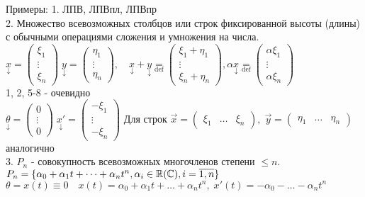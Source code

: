 \documentclass[../main.tex]{subfiles}
\begin{document}
Примеры: 1. ЛПВ, ЛПВпл, ЛПВпр
\\2. Множество всевозможных столбцов или строк фиксированной высоты (длины) с обычными операциями сложения и умножения на числа. $\underset{\downarrow}{x}=\begin{pmatrix}
    \xi_{1}\\ 
    \vdots \\ 
    \xi_{n}
\end{pmatrix}\; \underset{\downarrow}{y}=\begin{pmatrix}
    \eta_{1}\\ 
    \vdots \\ 
    \eta_{n}
\end{pmatrix}, \quad \underset{\downarrow}{x}+\underset{\downarrow}{y}\underset{\text{def}}{=} \begin{pmatrix}
    \xi_{1}+\eta_{1}\\ 
    \vdots \\ 
    \xi_{n}+\eta_{n}
\end{pmatrix}, \alpha \underset{\downarrow}{x}\underset{\text{def}}{=}\begin{pmatrix}
    \alpha \xi_{1}\\ 
    \vdots \\ 
    \alpha \xi_{n}
\end{pmatrix}$
\\ 1, 2, 5-8 - очевидно 
\\ $\underset{\downarrow}{\theta}=\begin{pmatrix}
    0\\ 
    \vdots \\ 
    0
\end{pmatrix}\; \underset{\downarrow}{x'}=\begin{pmatrix}
    -\xi_{1}\\ 
    \vdots \\ 
    -\xi_{n}
\end{pmatrix}$
Для строк $\vec{x}=\begin{pmatrix}
    \xi_{1} & \ldots & \xi_{n}
\end{pmatrix},\; \vec{y}= \begin{pmatrix}
    \eta_{1} & \ldots & \eta_{n}
\end{pmatrix}$ аналогично 
\\3. $P_{n}$ - совокупность всевозможных многочленов степени $\leqslant n$. $P_{n}=\{\alpha_{0}+\alpha_{1}t+\dots+\alpha_{n}t^{n},\alpha_{i}\in\mathbb{R}(\mathbb{C}), i=\overline{1,n}\}$
\\$\theta = x(t)\equiv 0 \quad x(t)=\alpha_{0}+\alpha_{1}t+\dots+\alpha_{n}t^{n},\; x'(t)= -\alpha_{0}-\dots-\alpha_{n}t^{n}$
\end{document}
